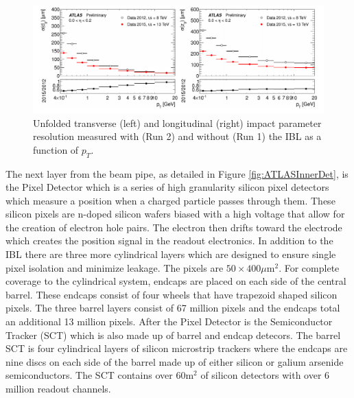 \begin{figure}[ht!]
	\centering
	\includegraphics[width=\columnwidth]{../ThesisImages/LHCImages/tracking.png}
	\caption[Unfolded transverse (left) and longitudinal (right) impact parameter resolutions measured with (Run 2) and without (Run 1) the IBL as a function of $p_T$.]{Unfolded transverse (left) and longitudinal (right) impact parameter resolution measured with (Run 2) and without (Run 1) the IBL as a function of $p_T$\cite{Takubo:2017wvt}.
	}
	\label{fig:impParamIBL}
\end{figure}

The next layer from the beam pipe, as detailed in Figure \ref{fig:ATLASInnerDet}, is the Pixel Detector which is a series of high granularity silicon pixel detectors which measure a position when a charged particle passes through them.  These silicon pixels are n-doped silicon wafers biased with a high voltage that allow for the creation of electron hole pairs.  The electron then drifts toward the electrode which creates the position signal in the readout electronics.  In addition to the IBL there are three more cylindrical layers which are designed to ensure single pixel isolation and minimize leakage.  The pixels are $50 \times 400\mu\text{m}^2$.  For complete coverage to the cylindrical system, endcaps are placed on each side of the central barrel.  These endcaps consist of four wheels that have trapezoid shaped silicon pixels.  The three barrel layers consist of 67 million pixels and the endcaps total an additional 13 million pixels.
After the Pixel Detector is the Semiconductor Tracker (SCT) which is also made up of barrel and endcap detecors.  The barrel SCT is four cylindrical layers of silicon microstrip trackers where the endcaps are nine discs on each side of the barrel made up of either silicon or galium arsenide semiconductors.  The SCT contains over $60\text{m}^2$ of silicon detectors with over 6 million readout channels.

